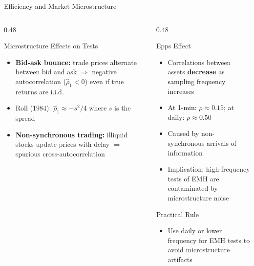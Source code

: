 \documentclass[9pt, aspectratio=169, t]{beamer}
\theoremstyle{definition}
\newenvironment{cminipage}[1]{%
    \par\noindent\hfill\begin{minipage}{#1}\ignorespaces
}{%
    \end{minipage}\hfill\null\par
}
\begin{document}
\begin{frame}{Efficiency and Market Microstructure}
\begin{cminipage}{0.95\textwidth}
\small
\begin{columns}[T]
\begin{column}{0.48\textwidth}
\begin{block}{Microstructure Effects on Tests}
\begin{itemize}\setlength{\itemsep}{0pt}
    \item \textbf{Bid-ask bounce:} trade prices alternate between bid and ask $\Rightarrow$ negative autocorrelation ($\hat{\rho}_1 < 0$) even if true returns are i.i.d.
    \item Roll (1984): $\hat{\rho}_1 \approx -s^2/4$ where $s$ is the spread
    \item \textbf{Non-synchronous trading:} illiquid stocks update prices with delay $\Rightarrow$ spurious cross-autocorrelation
\end{itemize}
\end{block}
\end{column}
\begin{column}{0.48\textwidth}
\begin{alertblock}{Epps Effect}
\begin{itemize}\setlength{\itemsep}{0pt}
    \item Correlations between assets \textbf{decrease} as sampling frequency increases
    \item At 1-min: $\rho \approx 0.15$; at daily: $\rho \approx 0.50$
    \item Caused by non-synchronous arrivals of information
    \item Implication: high-frequency tests of EMH are contaminated by microstructure noise
\end{itemize}
\end{alertblock}
\begin{exampleblock}{Practical Rule}
\begin{itemize}\setlength{\itemsep}{0pt}
    \item Use daily or lower frequency for EMH tests to avoid microstructure artifacts
\end{itemize}
\end{exampleblock}
\end{column}
\end{columns}
\end{cminipage}
\end{frame}
\end{document}
